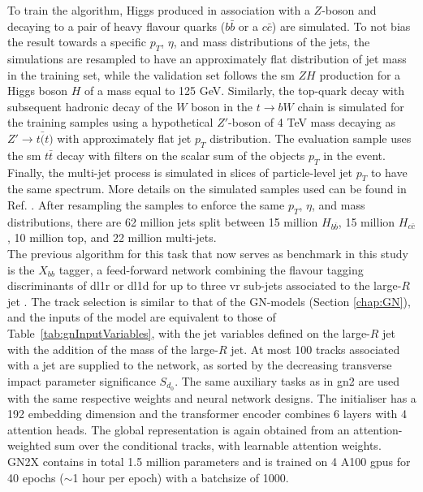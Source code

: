 To train the algorithm, Higgs produced in association with a $Z$-boson and decaying to a pair of heavy flavour quarks ($b\bar{b}$ or a $c\bar{c}$) are simulated. To not bias the result towards a specific $p_T$, $\eta$, and mass distributions of the jets, the simulations are resampled to have an approximately flat distribution of jet mass in the training set, while the validation set follows the \gls{sm} $ZH$ production for a Higgs boson $H$ of a mass equal to 125 GeV. Similarly, the top-quark decay with subsequent hadronic decay of the $W$ boson in the $t \rightarrow bW$ chain is simulated for the training samples using a hypothetical $Z'$-boson of 4 TeV mass decaying as $Z' \rightarrow t\bar(t)$ with approximately flat jet $p_T$ distribution. The evaluation sample uses the \gls{sm} $t\bar{t}$ decay with filters on the scalar sum of the objects $p_T$ in the event. Finally, the multi-jet process is simulated in slices of particle-level jet $p_T$ to have the same spectrum. More details on the simulated samples used can be found in Ref. \cite{ATL-PHYS-PUB-2023-021}. After resampling the samples to enforce the same $p_T$, $\eta$, and mass distributions, there are 62 million jets split between 15 million $H_{b\bar{b}}$, 15 million $H_{c\bar{c}}$, 10 million top, and 22 million multi-jets. \\

The previous algorithm for this task that now serves as benchmark in this study is the $X_{bb}$ tagger, a feed-forward network combining the flavour tagging discriminants of \gls{dl1r} or \gls{dl1d} for up to three \gls{vr} sub-jets associated to the large-$R$ jet \cite{ATL-PHYS-PUB-2020-019, ATL-PHYS-PUB-2021-035}. The track selection is similar to that of the GN-models (Section \ref{chap:GN}), and the inputs of the model are equivalent to those of Table~\ref{tab:gnInputVariables}, with the jet variables defined on the large-$R$ jet with the addition of the mass of the large-$R$ jet. At most 100 tracks associated with a jet are supplied to the network, as sorted by the decreasing transverse impact parameter significance $S_{d_0}$. The same auxiliary tasks as in \gls{gn2} are used with the same respective weights and neural network designs. The initialiser has a 192 embedding dimension and the transformer encoder combines 6 layers with 4 attention heads. The global representation is again obtained from an attention-weighted sum over the conditional tracks, with learnable attention weights. GN2X contains in total 1.5 million parameters and is trained on 4 A100 \gls{gpu}s for 40 epochs ($\sim$1 hour per epoch) with a batchsize of 1000. 


